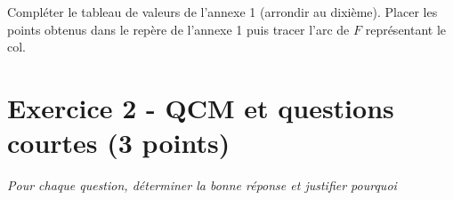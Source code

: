 \documentclass[answers]{exam}
\begin{document}
\begin{questions}
\question[2] Compléter le tableau de valeurs de l’annexe 1 (arrondir au dixième).
\question[2] Placer les points obtenus dans le repère de l’annexe 1 puis tracer l’arc de $F$ représentant le col.
  
\end{questions}

\section*{Exercice 2 - QCM et questions courtes (3 points)}

\emph{Pour chaque question, déterminer la bonne réponse et justifier pourquoi}
\end{document}
